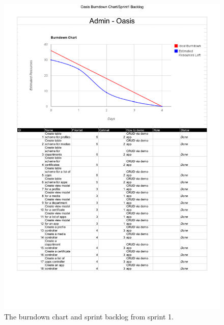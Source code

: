 \begin{figure}[htbp]
	\centering
		\includegraphics[width=\textwidth]{Images/sprint_backlogs/Oasis_Burndown_Chart_-_Sprint1_Backlog}
	\caption{The burndown chart and sprint backlog from sprint 1.}
	\label{fig:sprint1}
\end{figure}

